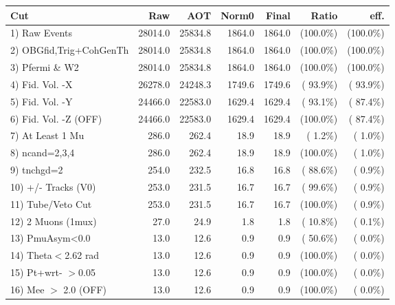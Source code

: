  \begin{table}[h!]\centering
 \begin{tabular}{||l||r|r|r|r|r|r||}
 \hline
 \hline
 Cut & Raw & AOT & Norm0 & Final & Ratio & eff.       \\
 \hline
  1) Raw Events           &      28014.0 &      25834.8 &       1864.0 &       1864.0 & (100.0\%) & (100.0\%) \\
  2) OBGfid,Trig+CohGenTh &      28014.0 &      25834.8 &       1864.0 &       1864.0 & (100.0\%) & (100.0\%) \\
  3) Pfermi \& W2         &      28014.0 &      25834.8 &       1864.0 &       1864.0 & (100.0\%) & (100.0\%) \\
  4) Fid. Vol. -X         &      26278.0 &      24248.3 &       1749.6 &       1749.6 & ( 93.9\%) & ( 93.9\%) \\
  5) Fid. Vol. -Y         &      24466.0 &      22583.0 &       1629.4 &       1629.4 & ( 93.1\%) & ( 87.4\%) \\
  6) Fid. Vol. -Z (OFF)   &      24466.0 &      22583.0 &       1629.4 &       1629.4 & (100.0\%) & ( 87.4\%) \\
  7) At Least 1 Mu        &        286.0 &        262.4 &         18.9 &         18.9 & (  1.2\%) & (  1.0\%) \\
  8) ncand=2,3,4          &        286.0 &        262.4 &         18.9 &         18.9 & (100.0\%) & (  1.0\%) \\
  9) tnchgd=2             &        254.0 &        232.5 &         16.8 &         16.8 & ( 88.6\%) & (  0.9\%) \\
 10) +/- Tracks (V0)      &        253.0 &        231.5 &         16.7 &         16.7 & ( 99.6\%) & (  0.9\%) \\
 11) Tube/Veto Cut        &        253.0 &        231.5 &         16.7 &         16.7 & (100.0\%) & (  0.9\%) \\
 12) 2 Muons (1mux)       &         27.0 &         24.9 &          1.8 &          1.8 & ( 10.8\%) & (  0.1\%) \\
 13) PmuAsym<0.0          &         13.0 &         12.6 &          0.9 &          0.9 & ( 50.6\%) & (  0.0\%) \\
 14) Theta$<$2.62 rad     &         13.0 &         12.6 &          0.9 &          0.9 & (100.0\%) & (  0.0\%) \\
 15) Pt+wrt- $>$0.05      &         13.0 &         12.6 &          0.9 &          0.9 & (100.0\%) & (  0.0\%) \\
 16) Mee $>$ 2.0  (OFF)   &         13.0 &         12.6 &          0.9 &          0.9 & (100.0\%) & (  0.0\%) \\

\end{tabular}
\end{table}

